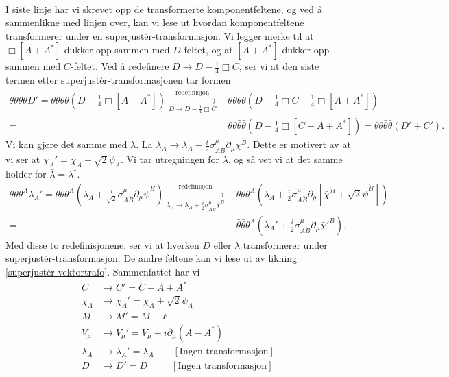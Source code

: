 \documentclass[notes.tex]{subfiles}
\begin{document}
\begin{Answer}
\begin{align}
\end{align}
I siste linje har vi skrevet opp de transformerte komponentfeltene, og ved å sammenlikne med linjen over, kan vi lese ut hvordan komponentfeltene transformerer under en superjustér-transformasjon. Vi legger merke til at $\Box[A + A^*]$ dukker opp sammen med $D$-feltet, og at $[A + A^*]$ dukker opp sammen med $C$-feltet. Ved å redefinere $D \to D - \frac{1}{4}\Box C$, ser vi at den siste termen etter superjustèr-transformasjonen tar formen 
\begin{align*}
    \theta \theta \bar{\theta}\bar{\theta}D' = \theta \theta \bar{\theta}\bar{\theta}\left(D -  \frac{1}{4}\Box[A + A^*]\right) \xrightarrow[D \to D - \frac{1}{4}\Box C]{\text{redefinisjon}}\, & \theta \theta \bar{\theta}\bar{\theta}\left(D - \frac{1}{4}\Box C - \frac{1}{4}\Box[A + A^*]\right) \\
    =\, & \theta \theta \bar{\theta}\bar{\theta}\left(D -  \frac{1}{4}\Box[C + A + A^*]\right) = \theta \theta \bar{\theta}\bar{\theta}(D' + C').
\end{align*}
Vi kan gjøre det samme med $\lambda$. La $\lambda_A \to \lambda_A + \frac{i}{2}\sigma^\mu_{A\dot{B}}\partial_\mu \bar{\chi}^{\dot{B}}$. Dette er motivert av at vi ser at $\chi_A' = \chi_A + \sqrt{2}\psi_A$. Vi tar utregningen for $\lambda$, og så vet vi at det samme holder for $\bar{\lambda} = \lambda^\dagger$.
\begin{align*}
    \bar{\theta}\bar{\theta}\theta^{A}\lambda_A' = \bar{\theta}\bar{\theta}\theta^{A}\left(\lambda_A + \frac{i}{\sqrt{2}}\sigma^\mu_{A\dot{B}}\partial_\mu \bar{\psi}^{\dot{B}}\right) \xrightarrow[\lambda_A \to \lambda_A + \tfrac{i}{2}\sigma^\mu_{A\dot{B}}\bar{\chi}^{\dot{B}}]{\text{redefinisjon}} 
    & \, \bar{\theta}\bar{\theta}\theta^A\left(\lambda_A + \frac{i}{2}\sigma^\mu_{A\dot{B}}\partial_\mu\left[\bar{\chi}^{\dot{B}} + \sqrt{2} \bar{\psi}^{\dot{B}}\right]\right) \\
    =&\, \bar{\theta}\bar{\theta}\theta^A(\lambda_A' + \frac{i}{2}\sigma^\mu_{A\dot{B}}\partial_\mu \bar{\chi}'^{\dot{B}}).
\end{align*}
Med disse to redefinisjonene, ser vi at hverken $D$ eller $\lambda$ transformerer under superjustér-transformasjon. De andre feltene kan vi lese ut av likning \eqref{superjustér-vektortrafo}. Sammenfattet har vi 
\begin{align*}
    C &\to C' = C + A + A^* \\
    \chi_A &\to \chi_A' = \chi_A + \sqrt{2}\psi_A \\
    M & \to M' = M + F \\
    V_\mu &\to V_\mu' = V_\mu + i \partial_\mu(A - A^*)\\
    \lambda_A &\to \lambda_A' = \lambda_A   \quad \quad [\text{Ingen transformasjon}] \\
    D &\to D' = D \quad \quad \, \,\,[\text{Ingen transformasjon}]
\end{align*}
\end{Answer}
\end{document}
